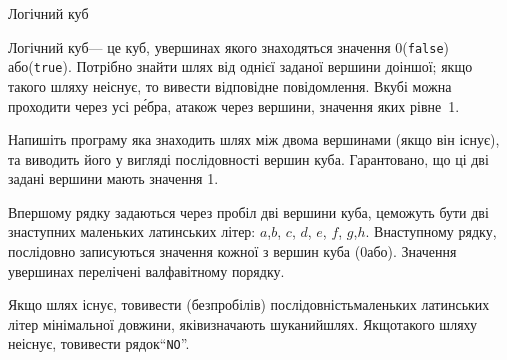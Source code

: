 \begin{problemAllDefault}{Логічний куб}

Логічний куб\nolinebreak[3] --- це куб, у\nolinebreak[3] вершинах якого знаходяться значення 0\nolinebreak[3] (\texttt{false}) або\nolinebreak[3] (\texttt{true}). Потрібно знайти шлях від однієї заданої вершини до\nolinebreak[2] іншої; якщо такого шляху не\nolinebreak[3] існує, то вивести відповідне повідомлення. В\nolinebreak[3] кубі можна проходити через усі р\'{е}бра, а\nolinebreak[3] також через вершини, значення яких рівне~1.

Напишіть програму яка знаходить шлях між двома вершинами (якщо він існує), та виводить його у вигляді послідовності вершин куба. Гарантовано, що ці дві задані вершини мають значення 1.

\InputFile
В\nolinebreak[3] першому рядку задаються через пробіл дві вершини куба, це\nolinebreak[1] можуть бути дві з\nolinebreak[3] наступних маленьких латинських літер: $a$,\nolinebreak[3] $b$, $c$, $d$, $e$, $f$, $g$,\nolinebreak[3] $h$. В\nolinebreak[3] наступному рядку, послідовно записуються значення кожної з вершин куба (0\nolinebreak[2] або). Значення у\nolinebreak[2] вершинах перелічені в\nolinebreak[2] алфавітному порядку.

\OutputFile\label{text:log-cude-as-example-of-non-unique-correct-answer}
Якщо шлях існує, то\nolinebreak[2] вивести (без\nolinebreak[2] пробілів) послідовність\linebreak[1] маленьких латинських літер мінімальної довжини, які\nolinebreak[2] визначають шуканий\nolinebreak[2] шлях. Якщо\nolinebreak[2] такого шляху не\nolinebreak[3] існує, то\nolinebreak[2] вивести рядок\nolinebreak[3] ``\texttt{NO}''.

\Examples
\begin{exampleSimple}{3em}{3em}%
%
%
\end{exampleSimple}

\end{problemAllDefault}

